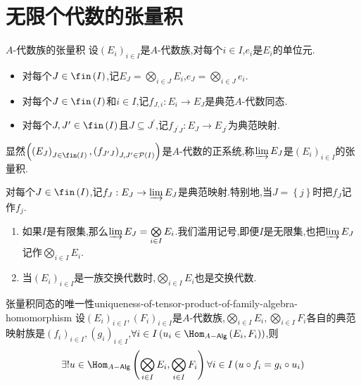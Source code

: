 \section{无限个代数的张量积}

\begin{definition}{$A$-代数族的张量积}{}
	设$\left(E_{i}\right)_{i\in I}$是$A$-代数族,对每个$i\in I$,$e_{i}$是$E_{i}$的单位元.
	\begin{itemize}
		\item 对每个$J\in\fin\left(I\right)$,记$E_{J}=\bigotimes\limits_{i\in J}E_{i}$,$e_{J}=\bigotimes\limits_{i\in J}e_{i}$.
		\item 对每个$J\in\fin\left(I\right)$和$i\in I$,记$f_{J,i}:E_{i}\to E_{J}$是典范$A$-代数同态.
		\item 对每个$J,J^{\prime}\in\fin\left(I\right)$且$J\subseteq J^{\prime}$,记$f_{J^{\prime}J}:E_{J}\to E_{J^{\prime}}$为典范映射.
	\end{itemize}
	显然$\left(\left(E_{J}\right)_{J\in\fin\left(I\right)},\left(f_{J^{\prime}J}\right)_{J,J^{\prime}\in\mathcal{P}\left(I\right)}\right)$是$A$-代数的正系统,称$\varinjlim E_{J}$是$\left(E_{i}\right)_{i\in I}$的张量积.
	
	对每个$J\in\fin\left(I\right)$,记$f_{J}:E_{J}\to\varinjlim E_{J}$是典范映射.特别地,当$J=\left\{j\right\}$时把$f_{J}$记作$f_{j}$.
\end{definition}

\begin{remark}{}{}
	\begin{enumerate}
		\item 如果$I$是有限集,那么$\varinjlim E_{J}=\bigotimes\limits_{i\in I}E_{i}$.我们滥用记号,即便$I$是无限集,也把$\varinjlim E_{J}$记作$\bigotimes\limits_{i\in I}E_{i}$.
		\item 当$\left(E_{i}\right)_{i\in I}$是一族交换代数时,$\bigotimes\limits_{i\in I}E_{i}$也是交换代数.
	\end{enumerate}
\end{remark}

\begin{corollary}{张量积同态的唯一性}{uniqueness-of-tensor-product-of-family-algebra-homomorphism}
	设$\left(E_{i}\right)_{i\in I},\left(F_{i}\right)_{i\in I}$是$A$-代数族,$\bigotimes\limits_{i\in I}E_{i},\bigotimes\limits_{i\in I}F_{i}$各自的典范映射族是$\left(f_{i}\right)_{i\in I},\left(g_{i}\right)_{i\in I}$,$\forall i\in I\left(u_{i}\in\Hom_{A-\mathsf{Alg}}\left(E_{i},F_{i}\right)\right)$,则
	\begin{align*}
		\exists!u\in\Hom_{A-\mathsf{Alg}}\left(\bigotimes\limits_{i\in I}E_{i},\bigotimes\limits_{i\in I}F_{i}\right)\forall i\in I\left(u\circ f_{i}=g_{i}\circ u_{i}\right)
	\end{align*}
\end{corollary}

